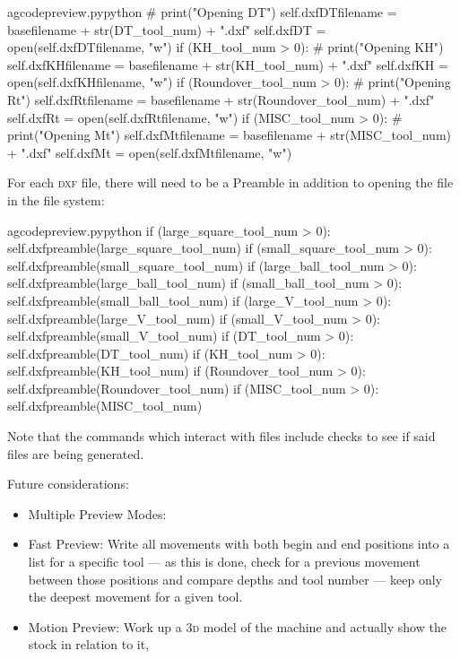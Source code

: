 \documentclass{ltxdoc}
\begin{document}
\begin{writecode}{a}{gcodepreview.py}{python}
#                print("Opening DT")
                self.dxfDTfilename = basefilename + str(DT_tool_num) + ".dxf"
                self.dxfDT = open(self.dxfDTfilename, "w")
            if (KH_tool_num > 0):
#                print("Opening KH")
                self.dxfKHfilename = basefilename + str(KH_tool_num) + ".dxf"
                self.dxfKH = open(self.dxfKHfilename, "w")
            if (Roundover_tool_num > 0):
#                print("Opening Rt")
                self.dxfRtfilename = basefilename + str(Roundover_tool_num) + ".dxf"
                self.dxfRt = open(self.dxfRtfilename, "w")
            if (MISC_tool_num > 0):
#                print("Opening Mt")
                self.dxfMtfilename = basefilename + str(MISC_tool_num) + ".dxf"
                self.dxfMt = open(self.dxfMtfilename, "w")
\end{writecode}
\addtocounter{gcpy}{95}

For each \textsc{dxf} file, there will need to be a Preamble in addition to opening the file in the file system:

\lstset{firstnumber=\thegcpy}
\begin{writecode}{a}{gcodepreview.py}{python}
            if (large_square_tool_num > 0):
                self.dxfpreamble(large_square_tool_num)
            if (small_square_tool_num > 0):
                self.dxfpreamble(small_square_tool_num)
            if (large_ball_tool_num > 0):
                self.dxfpreamble(large_ball_tool_num)
            if (small_ball_tool_num > 0):
                self.dxfpreamble(small_ball_tool_num)
            if (large_V_tool_num > 0):
                self.dxfpreamble(large_V_tool_num)
            if (small_V_tool_num > 0):
                self.dxfpreamble(small_V_tool_num)
            if (DT_tool_num > 0):
                self.dxfpreamble(DT_tool_num)
            if (KH_tool_num > 0):
                self.dxfpreamble(KH_tool_num)
            if (Roundover_tool_num > 0):
                self.dxfpreamble(Roundover_tool_num)
            if (MISC_tool_num > 0):
                self.dxfpreamble(MISC_tool_num)

\end{writecode}
\addtocounter{gcpy}{21}

Note that the commands which interact with files include checks to see if said files are being generated.


Future considerations:

\begin{itemize}
\item Multiple Preview Modes:
\item Fast Preview: Write all movements with both begin and end positions into a list for a specific tool --- as this is done, check for a previous movement between those positions and compare depths and tool number --- keep only the deepest movement for a given tool.
\item Motion Preview: Work up a \textsc{3d} model of the machine and actually show the stock in relation to it, 
\end{itemize}
\end{document}
